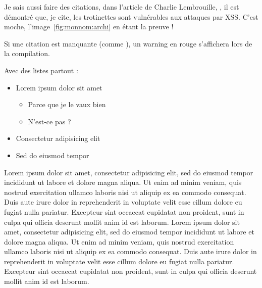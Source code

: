 
Je sais aussi faire des citations, dans l'article de Charlie
Lembrouille, \cite{monnom:charlielembrouille}, il est démontré que, je cite,
\og{}les trotinettes sont vulnérables aux attaques par XSS\fg{}. C'est
moche, l'image~\ref{fig:monnom:archi} en étant la preuve !

Si une citation est manquante (comme \cite{monnom:referencefoireuse}),
un warning en rouge s'affichera lors de la compilation.

Avec des listes partout :

\begin{itemize}
\item Lorem ipsum dolor sit amet
  \begin{itemize}
  \item Parce que je le vaux bien
  \item N'est-ce pas ?
  \end{itemize}
\item Consectetur adipisicing elit
\item Sed do eiusmod tempor
\end{itemize}

Lorem ipsum dolor sit amet, consectetur adipisicing elit, sed do
eiusmod tempor incididunt ut labore et dolore magna aliqua. Ut enim ad
minim veniam, quis nostrud exercitation ullamco laboris nisi ut
aliquip ex ea commodo consequat. Duis aute irure dolor in
reprehenderit in voluptate velit esse cillum dolore eu fugiat nulla
pariatur. Excepteur sint occaecat cupidatat non proident, sunt in
culpa qui officia deserunt mollit anim id est laborum. Lorem ipsum
dolor sit amet, consectetur adipisicing elit, sed do eiusmod tempor
incididunt ut labore et dolore magna aliqua. Ut enim ad minim veniam,
quis nostrud exercitation ullamco laboris nisi ut aliquip ex ea
commodo consequat. Duis aute irure dolor in reprehenderit in voluptate
velit esse cillum dolore eu fugiat nulla pariatur. Excepteur sint
occaecat cupidatat non proident, sunt in culpa qui officia deserunt
mollit anim id est laborum.

